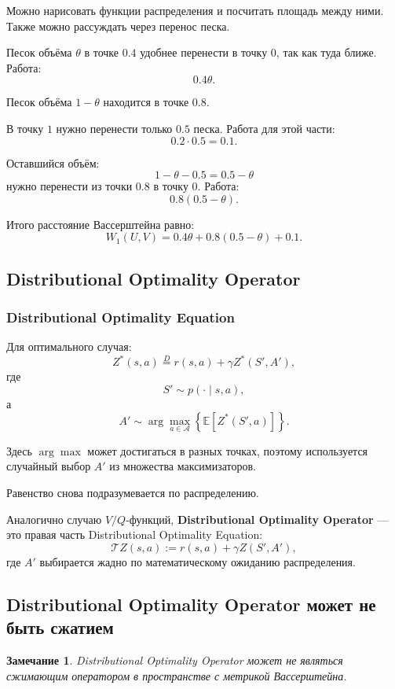 \documentclass[12pt,a4paper]{article}
\newtheorem{remark}{Замечание}
\begin{document}
Можно нарисовать функции распределения и посчитать площадь между ними. Также можно рассуждать через перенос песка.

Песок объёма $\theta$ в точке $0.4$ удобнее перенести в точку $0$, так как туда ближе. Работа:
\[
0.4\theta.
\]

Песок объёма $1-\theta$ находится в точке $0.8$.

В точку $1$ нужно перенести только $0.5$ песка. Работа для этой части:
\[
0.2 \cdot 0.5
=
0.1.
\]

Оставшийся объём:
\[
1-\theta-0.5
=
0.5-\theta
\]
нужно перенести из точки $0.8$ в точку $0$. Работа:
\[
0.8(0.5-\theta).
\]

Итого расстояние Вассерштейна равно:
\[
W_1(U,V)
=
0.4\theta
+
0.8(0.5-\theta)
+
0.1.
\]

\subsection{Distributional Optimality Operator}

\subsubsection{Distributional Optimality Equation}

Для оптимального случая:
\[
Z^\ast(s,a)
\overset{D}{=}
r(s,a)
+
\gamma Z^\ast(S',A'),
\]
где
\[
S' \sim p(\cdot\mid s,a),
\]
а
\[
A'
\sim
\arg\max_{a \in \mathcal A}
\left\{
\mathbb E
\left[
Z^\ast(S',a)
\right]
\right\}.
\]

Здесь $\arg\max$ может достигаться в разных точках, поэтому используется случайный выбор $A'$ из множества максимизаторов.

Равенство снова подразумевается по распределению.

Аналогично случаю $V/Q$-функций, \textbf{Distributional Optimality Operator} --- это правая часть Distributional Optimality Equation:
\[
\mathcal T Z(s,a)
:=
r(s,a)
+
\gamma Z(S',A'),
\]
где $A'$ выбирается жадно по математическому ожиданию распределения.

\subsection{Distributional Optimality Operator может не быть сжатием}

\begin{remark}
Distributional Optimality Operator может не являться сжимающим оператором в пространстве с метрикой Вассерштейна.
\end{remark}
\end{document}
